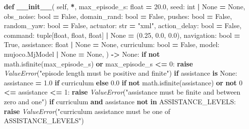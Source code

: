 \documentclass[
  american,
  11pt,
  letterpaper,
]{article}
\newenvironment{Shaded}{\begin{snugshade}}{\end{snugshade}}
\newcommand{\BuiltInTok}[1]{#1}
\newcommand{\ControlFlowTok}[1]{\textcolor[rgb]{0.13,0.29,0.53}{\textbf{#1}}}
\newcommand{\DecValTok}[1]{\textcolor[rgb]{0.00,0.00,0.81}{#1}}
\newcommand{\FloatTok}[1]{\textcolor[rgb]{0.00,0.00,0.81}{#1}}
\newcommand{\FunctionTok}[1]{\textcolor[rgb]{0.13,0.29,0.53}{\textbf{#1}}}
\newcommand{\KeywordTok}[1]{\textcolor[rgb]{0.13,0.29,0.53}{\textbf{#1}}}
\newcommand{\NormalTok}[1]{#1}
\newcommand{\OperatorTok}[1]{\textcolor[rgb]{0.81,0.36,0.00}{\textbf{#1}}}
\newcommand{\PreprocessorTok}[1]{\textcolor[rgb]{0.56,0.35,0.01}{\textit{#1}}}
\newcommand{\StringTok}[1]{\textcolor[rgb]{0.31,0.60,0.02}{#1}}
\newcommand{\VariableTok}[1]{\textcolor[rgb]{0.00,0.00,0.00}{#1}}
\renewenvironment{Shaded}{\par\smallskip}{\par\smallskip}
\begin{document}
\begin{Shaded}
\begin{Highlighting}[]
    \KeywordTok{def} \FunctionTok{\_\_init\_\_}\NormalTok{(}
        \VariableTok{self}\NormalTok{,}
        \OperatorTok{*}\NormalTok{,}
\NormalTok{        max\_episode\_s: }\BuiltInTok{float} \OperatorTok{=} \FloatTok{20.0}\NormalTok{,}
\NormalTok{        seed: }\BuiltInTok{int} \OperatorTok{|} \VariableTok{None} \OperatorTok{=} \VariableTok{None}\NormalTok{,}
\NormalTok{        obs\_noise: }\BuiltInTok{bool} \OperatorTok{=} \VariableTok{False}\NormalTok{,}
\NormalTok{        domain\_rand: }\BuiltInTok{bool} \OperatorTok{=} \VariableTok{False}\NormalTok{,}
\NormalTok{        pushes: }\BuiltInTok{bool} \OperatorTok{=} \VariableTok{False}\NormalTok{,}
\NormalTok{        random\_yaw: }\BuiltInTok{bool} \OperatorTok{=} \VariableTok{False}\NormalTok{,}
\NormalTok{        actuator: }\BuiltInTok{str} \OperatorTok{=} \StringTok{"xml"}\NormalTok{,}
\NormalTok{        action\_delay: }\BuiltInTok{bool} \OperatorTok{=} \VariableTok{False}\NormalTok{,}
\NormalTok{        command: }\BuiltInTok{tuple}\NormalTok{[}\BuiltInTok{float}\NormalTok{, }\BuiltInTok{float}\NormalTok{, }\BuiltInTok{float}\NormalTok{] }\OperatorTok{|} \VariableTok{None} \OperatorTok{=}\NormalTok{ (}\FloatTok{0.25}\NormalTok{, }\FloatTok{0.0}\NormalTok{, }\FloatTok{0.0}\NormalTok{),}
\NormalTok{        navigation: }\BuiltInTok{bool} \OperatorTok{=} \VariableTok{True}\NormalTok{,}
\NormalTok{        assistance: }\BuiltInTok{float} \OperatorTok{|} \VariableTok{None} \OperatorTok{=} \VariableTok{None}\NormalTok{,}
\NormalTok{        curriculum: }\BuiltInTok{bool} \OperatorTok{=} \VariableTok{False}\NormalTok{,}
\NormalTok{        model: mujoco.MjModel }\OperatorTok{|} \VariableTok{None} \OperatorTok{=} \VariableTok{None}\NormalTok{,}
\NormalTok{    ) }\OperatorTok{{-}\textgreater{}} \VariableTok{None}\NormalTok{:}
        \ControlFlowTok{if} \KeywordTok{not}\NormalTok{ math.isfinite(max\_episode\_s) }\KeywordTok{or}\NormalTok{ max\_episode\_s }\OperatorTok{\textless{}=} \DecValTok{0}\NormalTok{:}
            \ControlFlowTok{raise} \PreprocessorTok{ValueError}\NormalTok{(}\StringTok{"episode length must be positive and finite"}\NormalTok{)}
        \ControlFlowTok{if}\NormalTok{ assistance }\KeywordTok{is} \VariableTok{None}\NormalTok{:}
\NormalTok{            assistance }\OperatorTok{=} \FloatTok{1.0} \ControlFlowTok{if}\NormalTok{ curriculum }\ControlFlowTok{else} \FloatTok{0.0}
        \ControlFlowTok{if} \KeywordTok{not}\NormalTok{ math.isfinite(assistance) }\KeywordTok{or} \KeywordTok{not} \DecValTok{0} \OperatorTok{\textless{}=}\NormalTok{ assistance }\OperatorTok{\textless{}=} \DecValTok{1}\NormalTok{:}
            \ControlFlowTok{raise} \PreprocessorTok{ValueError}\NormalTok{(}\StringTok{"assistance must be finite and between zero and one"}\NormalTok{)}
        \ControlFlowTok{if}\NormalTok{ curriculum }\KeywordTok{and}\NormalTok{ assistance }\KeywordTok{not} \KeywordTok{in}\NormalTok{ ASSISTANCE\_LEVELS:}
            \ControlFlowTok{raise} \PreprocessorTok{ValueError}\NormalTok{(}\StringTok{"curriculum assistance must be one of ASSISTANCE\_LEVELS"}\NormalTok{)}


\end{Highlighting}
\end{Shaded}
\end{document}
